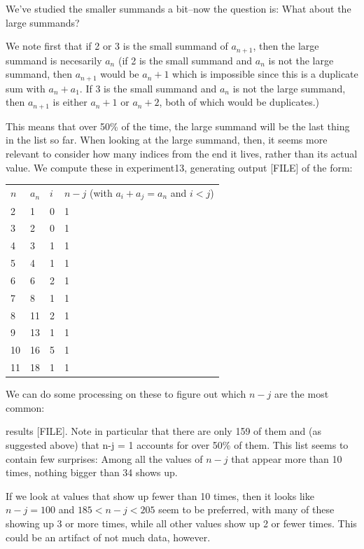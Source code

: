 \documentclass{article}
\theoremstyle{definition}
\theoremstyle{remark}
\numberwithin{equation}{section}
\begin{document}
{We've studied the smaller summands a bit--now the question is: What
about the large summands?

We note first that if 2 or 3 is the small summand of $a_{n+1}$, then
the large summand is necesarily $a_n$ (if 2 is the small summand and
$a_n$ is not the large summand, then $a_{n+1}$ would be $a_n + 1$
which is impossible since this is a duplicate sum with $a_n+a_1$.  If
3 is the small summand and $a_n$ is not the large summand, then
$a_{n+1}$ is either $a_n + 1$ or $a_n + 2$, both of which would be
duplicates.)

This means that over 50\% of the time, the large summand will be the
last thing in the list so far.  When looking at the large summand,
then, it seems more relevant to consider how many indices from the end
it lives, rather than its actual value.  We compute these in
experiment13, generating output [FILE] of the form:

\begin{tabular}{|l|l|l|l|}
$n$ 	&$a_n$	&$i$	&$n-j$ (with $a_i + a_j = a_n$ and $i < j$)\\
2 	&1 	&0 	&1\\
3 	&2 	&0 	&1\\
4 	&3 	&1 	&1\\
5 	&4 	&1 	&1\\
6 	&6 	&2 	&1\\
7 	&8 	&1 	&1\\
8 	&11 	&2 	&1\\
9 	&13 	&1 	&1\\
10 	&16 	&5 	&1\\
11 	&18 	&1 	&1
\end{tabular}

We can do some processing on these to figure out which $n-j$ are the
most common:


results [FILE].  Note in particular that there are only 159 of them
and (as suggested above) that n-j = 1 accounts for over 50\% of them.
This list seems to contain few surprises: Among all the values of $n-j$
that appear more than 10 times, nothing bigger than 34 shows up.

If we look at values that show up fewer than 10 times, then it looks
like $n-j = 100$ and $185 < n-j < 205$ seem to be preferred, with many
of these showing up 3 or more times, while all other values show up 2
or fewer times.  This could be an artifact of not much data, however.

}
\end{document}
